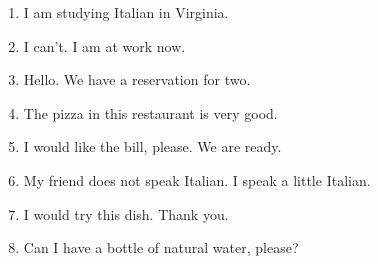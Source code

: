 \begin{enumerate}
	\item{I am studying Italian in Virginia.}           \\
	\item{I can’t. I am at work now.}                   \\
	\item{Hello. We have a reservation for two.}        \\
	\item{The pizza in this restaurant is very good.}   \\ 
	\item{I would like the bill, please. We are ready.} \\ 
	\item{My friend does not speak Italian. I speak a little Italian.} \\
	\item{I would try this dish. Thank you.}             \\
	\item{Can I have a bottle of natural water, please?} \\
\end{enumerate}

